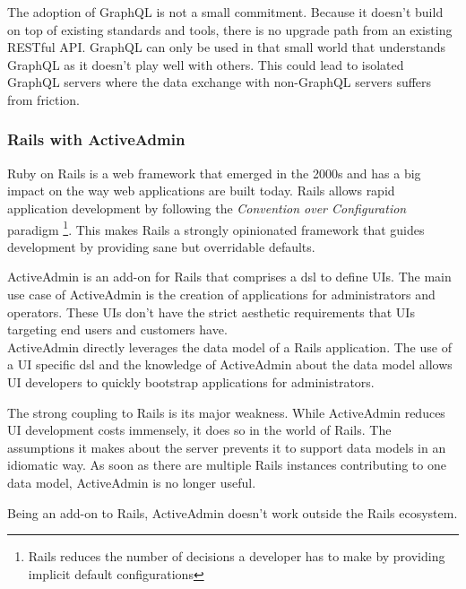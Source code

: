 The adoption of GraphQL is not a small commitment. Because it doesn't build on top of existing standards and tools, there is no upgrade path from an existing RESTful API. GraphQL can only be used in that small world that understands GraphQL as it doesn't play well with others. This could lead to isolated GraphQL servers where the data exchange with non-GraphQL servers suffers from friction.

\subsubsection{Rails with ActiveAdmin}
Ruby on Rails is a web framework that emerged in the 2000s and has a big impact on the way web applications are built today. \citep{rubyonrails} Rails allows rapid application development by following the \textit{Convention over Configuration} paradigm \footnote{Rails reduces the number of decisions a developer has to make by providing implicit default configurations}. This makes Rails a strongly opinionated framework that guides development by providing sane but overridable defaults.

ActiveAdmin is an add-on for Rails that comprises a \gls{dsl} to define UIs. The main use case of ActiveAdmin is the creation of applications for administrators and operators. These UIs don't have the strict aesthetic requirements that UIs targeting end users and customers have. \\
ActiveAdmin directly leverages the data model of a Rails application. The use of a UI specific \gls{dsl} and the knowledge of ActiveAdmin about the data model allows UI developers to quickly bootstrap applications for administrators.

The strong coupling to Rails is its major weakness. While ActiveAdmin reduces UI development costs immensely, it does so in the world of Rails. The assumptions it makes about the server prevents it to support data models in an idiomatic way. As soon as there are multiple Rails instances contributing to one data model, ActiveAdmin is no longer useful.

Being an add-on to Rails, ActiveAdmin doesn't work outside the Rails ecosystem.
